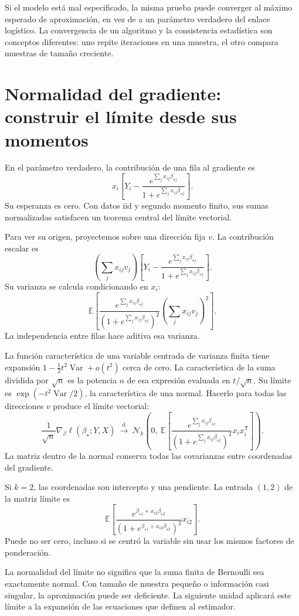 \documentclass[11pt,a4paper]{article}
\newcommand{\E}{\mathbb E}
\newcommand{\T}{^{\mathsf T}}
\DeclareMathOperator{\Var}{Var}
\begin{document}
Si el modelo está mal especificado, la misma prueba puede
converger al máximo esperado de aproximación, en vez de a un
parámetro verdadero del enlace logístico.
La convergencia de un algoritmo y la consistencia estadística
son conceptos diferentes: uno repite iteraciones en una muestra,
el otro compara muestras de tamaño creciente.

\clearpage
\section{Normalidad del gradiente: construir el límite desde sus momentos}\label{logit54}
En el parámetro verdadero, la contribución de una fila al gradiente es
\[
x_i\left[
Y_i-\frac{e^{\sum_jx_{ij}\beta_{\star j}}}
{1+e^{\sum_jx_{ij}\beta_{\star j}}}\right].
\]
Su esperanza es cero.
Con datos iid y segundo momento finito, sus sumas normalizadas
satisfacen un teorema central del límite vectorial.

Para ver su origen, proyectemos sobre una dirección fija $v$.
La contribución escalar es
\[
\left(\sum_jx_{ij}v_j\right)
\left[
Y_i-\frac{e^{\sum_jx_{ij}\beta_{\star j}}}
{1+e^{\sum_jx_{ij}\beta_{\star j}}}\right].
\]
Su varianza se calcula condicionando en $x_i$:
\[
\E\!\left[
\frac{e^{\sum_jx_{ij}\beta_{\star j}}}
{(1+e^{\sum_jx_{ij}\beta_{\star j}})^2}
\left(\sum_jx_{ij}v_j\right)^2\right].
\]
La independencia entre filas hace aditiva esa varianza.

La función característica de una variable centrada de varianza
finita tiene expansión
$1-\tfrac12t^2\Var+o(t^2)$ cerca de cero.
La característica de la suma dividida por $\sqrt n$
es la potencia $n$ de esa expresión evaluada en $t/\sqrt n$.
Su límite es $\exp(-t^2\Var/2)$, la característica de una normal.
Hacerlo para todas las direcciones $v$ produce el límite vectorial:
\[
\frac1{\sqrt n}\nabla_\beta\ell(\beta_\star;Y,X)
\ \xrightarrow{\mathrm d}\
\mathcal N_k\!\left(
0,\
\E\!\left[
\frac{e^{\sum_jx_{ij}\beta_{\star j}}}
{(1+e^{\sum_jx_{ij}\beta_{\star j}})^2}x_ix_i\T
\right]\right).
\]
La matriz dentro de la normal conserva todas las covarianzas
entre coordenadas del gradiente.

\begin{ejemplo}
Si $k=2$, las coordenadas son intercepto y una pendiente.
La entrada $(1,2)$ de la matriz límite es
\[
\E\!\left[
\frac{e^{\beta_{\star1}+x_{i2}\beta_{\star2}}}
{(1+e^{\beta_{\star1}+x_{i2}\beta_{\star2}})^2}x_{i2}\right].
\]
Puede no ser cero, incluso si se centró la variable sin usar
los mismos factores de ponderación.
\end{ejemplo}
La normalidad del límite no significa que la suma finita de
Bernoulli sea exactamente normal.
Con tamaño de muestra pequeño o información casi singular,
la aproximación puede ser deficiente.
La siguiente unidad aplicará este límite a la expansión
de las ecuaciones que definen al estimador.
\end{document}
